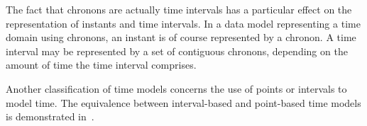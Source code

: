 The fact that chronons are actually time intervals has a particular effect on the representation of instants and time intervals. In a data model representing a time domain using chronons, an instant is of course represented by a chronon. A time interval may be represented by a set of contiguous chronons, depending on the amount of time the time interval comprises.



Another classification of time models concerns the use of points or intervals to model time. The equivalence between interval-based and point-based time models is demonstrated in~\cite{Bohlen1998}.



